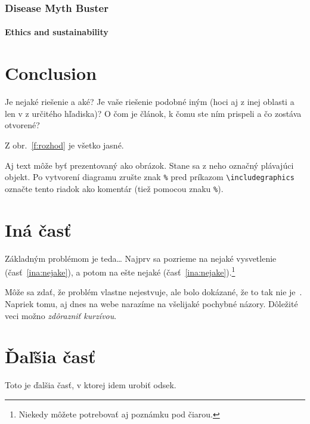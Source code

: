 \documentclass[11pt ,english,a4paper]{article}
\begin{document}
\subsubsection{Disease Myth Buster}

\paragraph{Ethics and sustainability}

\section{Conclusion}\label{conclusion}

Je nejaké riešenie a aké?
Je vaše riešenie podobné iným (hoci aj z inej oblasti a len v z určitého hľadiska)?
O čom je článok, k čomu ste ním prispeli a čo zostáva otvorené?

Z obr.~\ref{f:rozhod} je všetko jasné. 

\begin{figure*}[tbh]
\centering
Aj text môže byť prezentovaný ako obrázok. Stane sa z neho označný plávajúci objekt. Po vytvorení diagramu zrušte znak \texttt{\%} pred príkazom \verb|\includegraphics| označte tento riadok ako komentár (tiež pomocou znaku \texttt{\%}).
\caption{Rozhodujuci argument.}
\label{f:rozhod}
\end{figure*}



\section{Iná časť} \label{ina}

Základným problémom je teda\ldots{} Najprv sa pozrieme na nejaké vysvetlenie (časť~\ref{ina:nejake}), a potom na ešte nejaké (časť~\ref{ina:nejake}).\footnote{Niekedy môžete potrebovať aj poznámku pod čiarou.}

Môže sa zdať, že problém vlastne nejestvuje\cite{bar21health}, ale bolo dokázané, že to tak nie je~\cite{bar21health}. Napriek tomu, aj dnes na webe narazíme na všelijaké pochybné názory\cite{bar21health}. Dôležité veci možno \emph{zdôrazniť kurzívou}.

\section{Ďaľšia časť}
Toto je ďalšia časť, v ktorej idem urobiť odsek.
\end{document}
